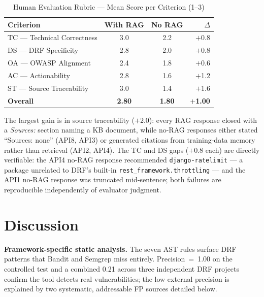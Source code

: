 \documentclass[conference]{IEEEtran}
\begin{document}
\begin{table}[htbp]
\caption{Human Evaluation Rubric — Mean Score per Criterion (1–3)}
\label{tab:rubric}
\centering
\small
\setlength{\tabcolsep}{4pt}
\begin{tabular}{@{}lccr@{}}
\toprule
\textbf{Criterion} & \textbf{With RAG} & \textbf{No RAG} & \textbf{$\Delta$} \\
\midrule
TC — Technical Correctness & 3.0 & 2.2 & $+$0.8 \\
DS — DRF Specificity       & 2.8 & 2.0 & $+$0.8 \\
OA — OWASP Alignment       & 2.4 & 1.8 & $+$0.6 \\
AC — Actionability         & 2.8 & 1.6 & $+$1.2 \\
ST — Source Traceability   & 3.0 & 1.4 & $+$1.6 \\
\midrule
\textbf{Overall}           & \textbf{2.80} & \textbf{1.80} & $+$\textbf{1.00} \\
\bottomrule
\end{tabular}
\end{table}

The largest gain is in source traceability ($+$2.0): every RAG response
closed with a \textit{Sources:} section naming a KB document, while no-RAG
responses either stated ``Sources: none'' (API8, API3) or generated
citations from training-data memory rather than retrieval (API2, API4).
The TC and DS gaps ($+$0.8 each) are directly verifiable: the API4 no-RAG
response recommended \texttt{django-ratelimit} — a package unrelated to
DRF's built-in \texttt{rest\_framework.throttling} — and the API1 no-RAG
response was truncated mid-sentence; both failures are reproducible
independently of evaluator judgment.

\section{Discussion}

\textbf{Framework-specific static analysis.} The seven AST rules surface
DRF patterns that Bandit and Semgrep miss entirely. Precision~=~1.00 on the
controlled test and a combined 0.21 across three independent DRF projects
confirm the tool detects real vulnerabilities; the low external precision is
explained by two systematic, addressable FP sources detailed below.
\end{document}

